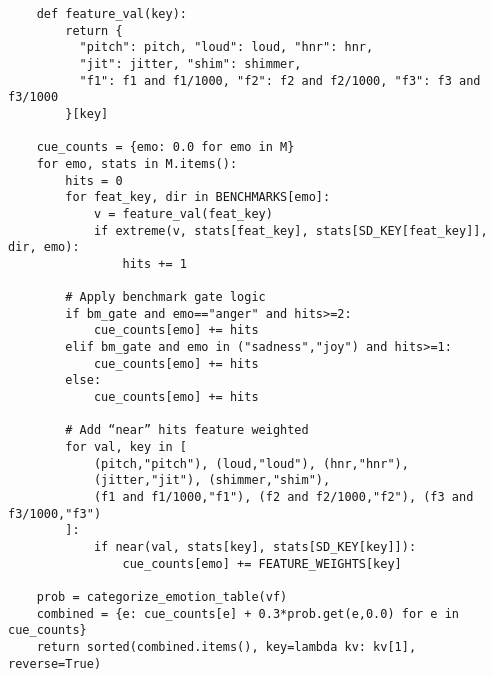 \begin{lstlisting}
    def feature_val(key):
        return {
          "pitch": pitch, "loud": loud, "hnr": hnr,
          "jit": jitter, "shim": shimmer,
          "f1": f1 and f1/1000, "f2": f2 and f2/1000, "f3": f3 and f3/1000
        }[key]

    cue_counts = {emo: 0.0 for emo in M}
    for emo, stats in M.items():
        hits = 0
        for feat_key, dir in BENCHMARKS[emo]:
            v = feature_val(feat_key)
            if extreme(v, stats[feat_key], stats[SD_KEY[feat_key]], dir, emo):
                hits += 1

        # Apply benchmark gate logic
        if bm_gate and emo=="anger" and hits>=2:
            cue_counts[emo] += hits
        elif bm_gate and emo in ("sadness","joy") and hits>=1:
            cue_counts[emo] += hits
        else:
            cue_counts[emo] += hits

        # Add “near” hits feature weighted
        for val, key in [
            (pitch,"pitch"), (loud,"loud"), (hnr,"hnr"),
            (jitter,"jit"), (shimmer,"shim"),
            (f1 and f1/1000,"f1"), (f2 and f2/1000,"f2"), (f3 and f3/1000,"f3")
        ]:
            if near(val, stats[key], stats[SD_KEY[key]]):
                cue_counts[emo] += FEATURE_WEIGHTS[key]

    prob = categorize_emotion_table(vf)
    combined = {e: cue_counts[e] + 0.3*prob.get(e,0.0) for e in cue_counts}
    return sorted(combined.items(), key=lambda kv: kv[1], reverse=True)
\end{lstlisting}



